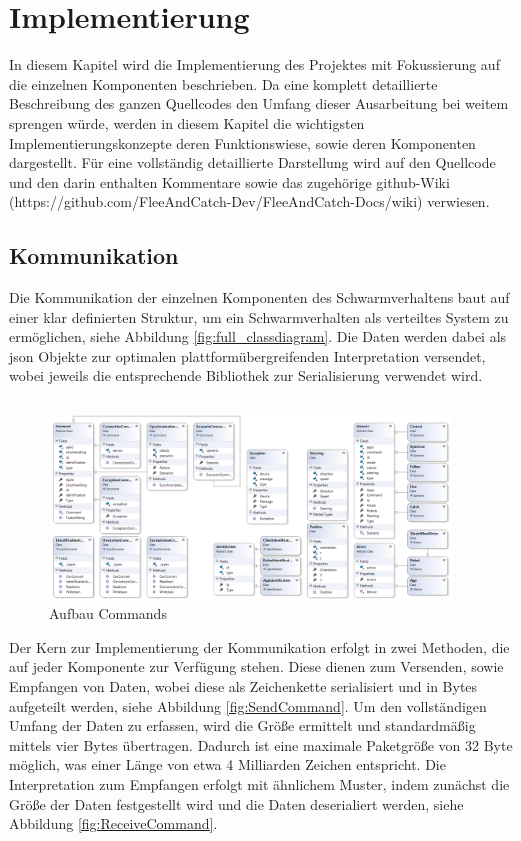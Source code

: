 \section{Implementierung}

In diesem Kapitel wird die Implementierung des Projektes mit Fokussierung auf die einzelnen Komponenten beschrieben. Da eine komplett detaillierte Beschreibung des ganzen Quellcodes den Umfang dieser Ausarbeitung bei weitem sprengen würde, werden in diesem Kapitel die wichtigsten Implementierungskonzepte deren Funktionswiese, sowie deren Komponenten dargestellt. Für eine vollständig detaillierte Darstellung wird auf den Quellcode und den darin enthalten Kommentare sowie das zugehörige 
github-Wiki (https://github.com/FleeAndCatch-Dev/FleeAndCatch-Docs/wiki) verwiesen.

\subsection{Kommunikation}

Die Kommunikation der einzelnen Komponenten des Schwarmverhaltens baut auf einer klar definierten Struktur, um ein Schwarmverhalten als verteiltes System zu ermöglichen, siehe Abbildung \eqref{fig:full_classdiagram}. Die Daten werden dabei als \gls{json} Objekte zur optimalen plattformübergreifenden Interpretation versendet, wobei jeweils die entsprechende Bibliothek zur Serialisierung verwendet wird.
\begin{verbatim}
\end{verbatim}
\begin{figure}[h]
	\begin{center}
		\includegraphics[width=0.95\textwidth]{images/uml/full_class_diagram.png}
	\end{center}
	\caption{Aufbau Commands}
	\label{fig:full_classdiagram}
\end{figure}

\newpage
\noindent
Der Kern zur Implementierung der Kommunikation erfolgt in zwei Methoden, die auf jeder Komponente zur Verfügung stehen. Diese dienen zum Versenden, sowie Empfangen von Daten, wobei diese als Zeichenkette serialisiert und in Bytes aufgeteilt werden, siehe Abbildung \eqref{fig:SendCommand}. Um den vollständigen Umfang der Daten zu erfassen, wird die Größe ermittelt und standardmäßig mittels vier Bytes übertragen. Dadurch ist eine maximale Paketgröße von 32 Byte möglich, was einer Länge von etwa 4 Milliarden Zeichen entspricht. Die Interpretation zum Empfangen erfolgt mit ähnlichem Muster, indem zunächst die Größe der Daten festgestellt wird und die Daten deserialiert werden, siehe Abbildung \eqref{fig:ReceiveCommand}.


